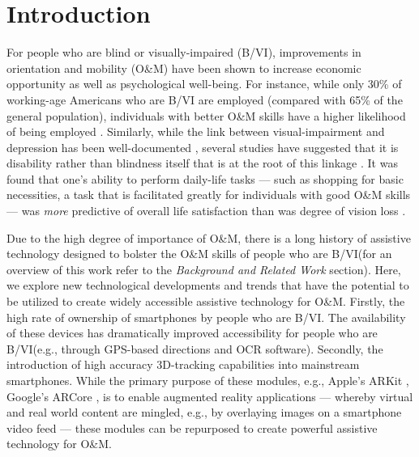 \documentclass[chi_draft]{sigchi}
\newcommand{\BVI}{B/VI\xspace}
\newcommand{\OM}{O\&M\xspace}
\begin{document}
\section{Introduction}
For people who are blind or visually-impaired (\BVI), improvements in orientation and mobility (\OM) have been shown to increase economic opportunity as well as psychological well-being.  For instance, while only 30\% of working-age Americans who are \BVI are employed \cite{employmentstatistics2017, kirchner1999looking} (compared with 65\% of the general population), individuals with better \OM skills have a higher likelihood of being employed \cite{crudden1998comprehensive, crudden1999barriers, leonard1999factors, o1999employment}.   Similarly, while the link between visual-impairment and depression has been well-documented \cite{rubin1994visual, rovner1996depression, hayman2007depression, heyl2001psychosocial}, several studies have suggested that it is disability rather than blindness itself that is at the root of this linkage \cite{rovner1996depression, williams1998psychosocial}.  It was found that one's ability to perform daily-life tasks --- such as shopping for basic necessities, a task that is facilitated greatly for individuals with good \OM skills --- was \emph{more} predictive of overall life satisfaction than was degree of vision loss \cite{williams1998psychosocial}.

Due to the high degree of importance of \OM, there is a long history of assistive technology designed to bolster the \OM skills of people who are \BVI (for an overview of this work refer to the \emph{Background and Related Work} section).  Here, we explore new technological developments and trends that have the potential to be utilized to create widely accessible assistive technology for \OM.  Firstly, the high rate of ownership of smartphones by people who are \BVI \cite{morris2014blind}.  The availability of these devices has dramatically improved accessibility for people who are \BVI (e.g., through GPS-based directions and OCR software).  Secondly, the introduction of high accuracy 3D-tracking capabilities into mainstream smartphones.  While the primary purpose of these modules, e.g., Apple's ARKit \cite{arkit}, Google's ARCore \cite{arcore}, is to enable augmented reality applications --- whereby virtual and real world content are mingled, e.g., by overlaying images on a smartphone video feed --- these modules can be repurposed to create powerful assistive technology for \OM.
\end{document}

